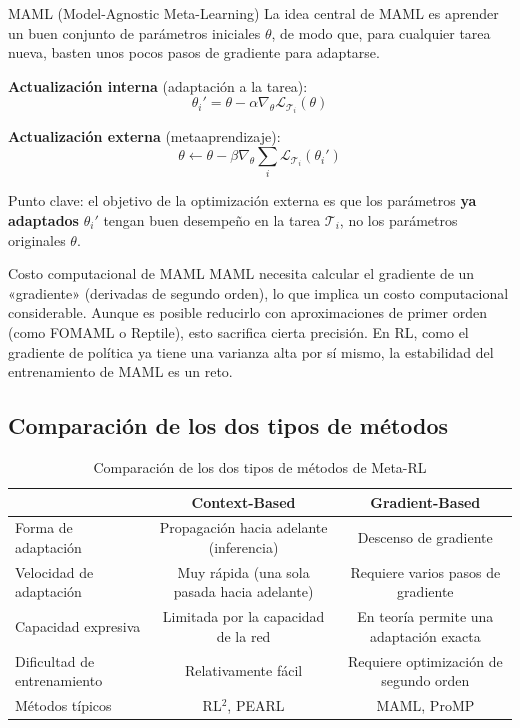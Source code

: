 \begin{importantbox}{MAML (Model-Agnostic Meta-Learning)}
La idea central de MAML es aprender un buen conjunto de parámetros iniciales $\theta$, de modo que, para cualquier tarea nueva, basten unos pocos pasos de gradiente para adaptarse.

\textbf{Actualización interna} (adaptación a la tarea):
$$\theta_i' = \theta - \alpha \nabla_\theta \mathcal{L}_{\mathcal{T}_i}(\theta)$$

\textbf{Actualización externa} (metaaprendizaje):
$$\theta \leftarrow \theta - \beta \nabla_\theta \sum_i \mathcal{L}_{\mathcal{T}_i}(\theta_i')$$

Punto clave: el objetivo de la optimización externa es que los parámetros \textbf{ya adaptados} $\theta_i'$ tengan buen desempeño en la tarea $\mathcal{T}_i$, no los parámetros originales $\theta$.
\end{importantbox}

\begin{warningbox}{Costo computacional de MAML}
MAML necesita calcular el gradiente de un «gradiente» (derivadas de segundo orden), lo que implica un costo computacional considerable. Aunque es posible reducirlo con aproximaciones de primer orden (como FOMAML o Reptile), esto sacrifica cierta precisión. En RL, como el gradiente de política ya tiene una varianza alta por sí mismo, la estabilidad del entrenamiento de MAML es un reto.
\end{warningbox}

\subsection{Comparación de los dos tipos de métodos}

\begin{table}[H]
\centering
\begin{tabular}{lcc}
\toprule
& \textbf{Context-Based} & \textbf{Gradient-Based} \\
\midrule
Forma de adaptación & Propagación hacia adelante (inferencia) & Descenso de gradiente \\
Velocidad de adaptación & Muy rápida (una sola pasada hacia adelante) & Requiere varios pasos de gradiente \\
Capacidad expresiva & Limitada por la capacidad de la red & En teoría permite una adaptación exacta \\
Dificultad de entrenamiento & Relativamente fácil & Requiere optimización de segundo orden \\
Métodos típicos & RL$^2$, PEARL & MAML, ProMP \\
\bottomrule
\end{tabular}
\caption{Comparación de los dos tipos de métodos de Meta-RL}
\end{table}

